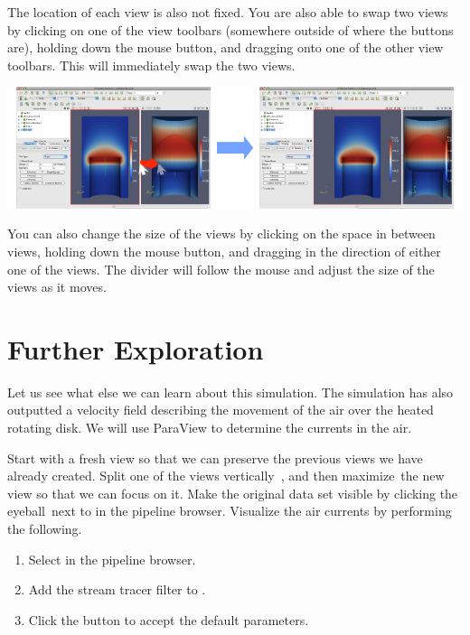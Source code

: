 The location of each view is also not fixed.  You are also able to swap two
views by clicking on one of the view toolbars (somewhere outside of where
the buttons are), holding down the mouse button, and dragging onto one of
the other view toolbars.  This will immediately swap the two views.

\begin{inlinefig}
  \includegraphics[width=\linewidth]{images/ResizeViews}
\end{inlinefig}

You can also change the size of the views by clicking on the space in
between views, holding down the mouse button, and dragging in the direction
of either one of the views.  The divider will follow the mouse and adjust
the size of the views as it moves.


\section{Further Exploration}

Let us see what else we can learn about this simulation.  The simulation
has also outputted a velocity field describing the movement of the air over
the heated rotating disk.  We will use ParaView to determine the currents
in the air.

Start with a fresh view so that we can preserve the previous views we have
already created.  Split one of the views vertically~\splitViewV, and then
maximize~\maximizeView the new view so that we can focus on it.  Make the
original data set visible by clicking the eyeball~\eyeballg next to
 in the pipeline browser.  Visualize the air
currents by performing the following.

\begin{enumerate}
\item Select  in the pipeline browser.
\item Add the stream tracer filter \streamTracer to
  .
\item Click the \apply button to accept the default parameters.
  \savecounter
\end{enumerate}

